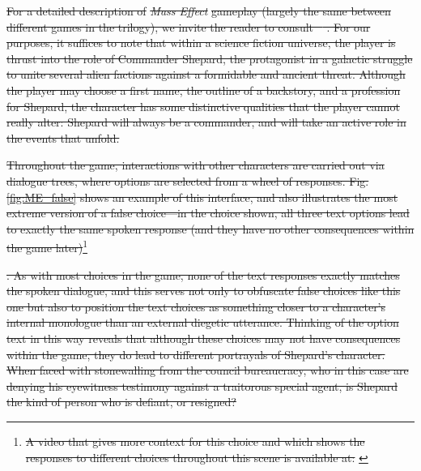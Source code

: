 \documentclass[arts,article,submit,moreauthors,pdftex,10pt,a4paper]{Definitions/mdpi}
\providecommand{\DIFdel}[1]{{\protect\color{red}\sout{#1}}}                      %
\begin{document}
\DIFdel{For a detailed description of }\emph{\DIFdel{Mass Effect}} %
\DIFdel{gameplay (largely the same between different games in the trilogy), we invite the reader to consult \mbox{%
\cite{bizzocchi2012mass}}\hspace{0pt}%
.
For our purposes, it suffices to note that within a science fiction universe, the player is thrust into the role of Commander Shepard, the protagonist in a galactic struggle to unite several alien factions against a formidable and ancient threat.
Although the player may choose a first name, the outline of a backstory, and a profession for Shepard, the character has some distinctive qualities that the player cannot really alter: Shepard will always be a commander, and will take an active role in the events that unfold.
}%

\DIFdel{Throughout the game, interactions with other characters are carried out via dialogue trees, where options are selected from a wheel of responses.
Fig. \ref{fig:ME_false} shows an example of this interface, and also illustrates the most extreme version of a false choice---in the choice shown, all three text options lead to exactly the same spoken response (and they have no other consequences within the game later)}\footnote{\DIFdel{A video that gives more context for this choice and which shows the responses to different choices throughout this scene is available at: }%
}%
\addtocounter{footnote}{-1}%
\DIFdel{.
As with most choices in the game, none of the text responses exactly matches the spoken dialogue, and this serves not only to obfuscate false choices like this one but also to position the text choices as something closer to a character's internal monologue than an external diegetic utterance.
Thinking of the option text in this way reveals that although these choices may not have consequences within the game, they do lead to different portrayals of Shepard's character.
When faced with stonewalling from the council bureaucracy, who in this case are denying his eyewitness testimony against a traitorous special agent, is Shepard the kind of person who is defiant, or resigned?
}%
\end{document}
